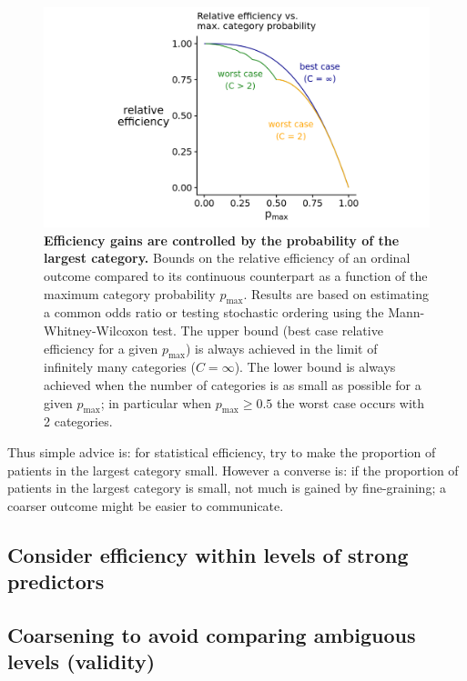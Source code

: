 \documentclass[
  11pt,
  fleqn
]{article}
\begin{document}
\begin{figure}
  \includegraphics[width=6in]{p_max_controls_efficiency.png}
  \caption{\textbf{Efficiency gains are controlled by the probability
    of the largest category.} Bounds on the relative efficiency of an
    ordinal outcome
    compared to its continuous counterpart as a function of the maximum
    category probability $p_\text{max}$. Results are based on
    estimating a common odds ratio or testing stochastic ordering
    using the Mann-Whitney-Wilcoxon test. The upper bound (best case
    relative efficiency for a given $p_\text{max}$) is always
    achieved in the
    limit of infinitely many categories ($C = \infty$). The lower bound
    is always achieved when the number of categories is as small as
    possible for a given $p_\text{max}$; in particular when
  $p_\text{max} \geq 0.5$ the worst case occurs with 2 categories.}
  \label{fig:p_max}
\end{figure}

Thus simple advice is: for statistical efficiency, try to make
the proportion
of patients in the largest category small. However a converse is: if the
proportion of patients in the largest category is small, not much
is gained by
fine-graining; a coarser outcome might be easier to communicate.

\subsection{Consider efficiency within levels of strong predictors}

\subsection{Coarsening to avoid comparing ambiguous levels (validity)}
\end{document}
